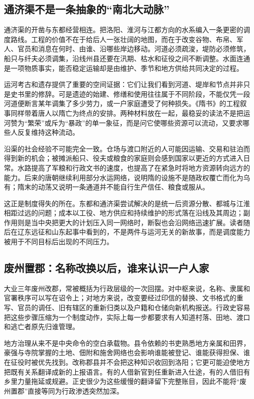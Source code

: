 \subsection{通济渠不是一条抽象的“南北大动脉”}
通济渠的开凿与东都经营相连。把洛阳、淮河与江都方向的水系编入一条更密的调度路线。工程的价值不在于给后人一张壮阔的地图，而在于改变谷物、布帛、军人、官员和消息在何时、由谁、沿哪些岸边移动。河道必须疏浚，堤防必须修筑，船只与纤夫必须调集，沿线州县还要在汛期、枯水和征役之间不断调整。水面连通是一项物质事实，能否稳定运输却是由维护、季节和地方供给共同决定的过程。

运河考古和遗存提供了重要的空间证据：它们让我们看到河道、堤岸和节点并非只是史书里的修辞。可是遗迹的始建、修缮和使用往往属于不同阶段，不能仅凭一段河道便断言某年调集了多少劳力，或一户家庭遭受了何种损失。《隋书》的工程叙事同样带着唐人以隋亡为终点的安排。两种材料放在一起，最稳妥的读法不是把运河赞为“繁荣”或斥为“暴政”的单一象征，而是问它使哪些资源可以流动，又要求哪些人反复维持这种流动。

沿渠的社会经验不可能完全一致。仓场与渡口附近的人可能因运输、交易和驻泊而得到新的机会；被摊派船只、役夫或粮食的家庭则会感到国家以更近的方式进入日常。水路提高了军粮和行政文书的速度，也提高了在紧急时将地方资源转向远方的能力。后来的唐朝继续利用部分水运网络，说明隋的设施不是随政权覆亡而化为乌有；隋末的动荡又说明一条通道并不能自行生产信任、粮食或服从。

这正是制度得失的所在。东都和通济渠尝试解决的是统一后资源分散、都城与江淮相距过远的问题；成本以工役、地方供应和持续维护的形式落在沿线及其周边；副作用则是当中央把更大的计划压入同一网络时，断裂也会沿网络迅速扩展。读者随后在辽东远征和山东起事中看到的，不是两件与运河无关的新故事，而是调度能力被用于不同目标后出现的不同压力。

\subsection{废州置郡：名称改换以后，谁来认识一户人家}
大业三年废州改郡，常被概括为行政层级的一次回摆。对中枢来说，名称、隶属和官署秩序可以写在诏令上；对地方来说，改变要经过印信的替换、文书格式的重写、官员的调任、旧有辖区的重新归类以及户籍和仓储向新机构报送。行政史容易把这些步骤压缩为一个制度动作，实际上每一步都要求有人知道村落、田地、渡口和逃亡者原先归谁管理。

地方治理从来不是中央命令的空白承载物。县令依赖的书吏熟悉地方亲属和田界，豪强与寺院掌握的土地、佃附和施舍网络也会影响谁能被登记、谁能获得担保、谁在征役时被优先找到。改称郡县并不会把这种知识收回到洛阳；它更可能迫使地方把既有关系翻译成新的上报语言。有的人借新官到任重新进入仕途，有的人借旧有乡里力量拖延或规避。正史很少为这些缓慢的翻译留下完整账目，因此不能将“废州置郡”直接等同为行政渗透突然加深。

